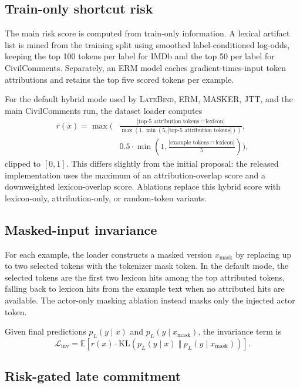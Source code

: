\documentclass{article}
\newcommand{\LateBind}{\textsc{LateBind}}
\newcommand{\risk}{r(x)}
\begin{document}
\subsection{Train-only shortcut risk}

The main risk score is computed from train-only information. A lexical artifact list is mined from the training split using smoothed label-conditioned log-odds, keeping the top 100 tokens per label for IMDb and the top 50 per label for CivilComments. Separately, an ERM model caches gradient-times-input token attributions and retains the top five scored tokens per example.

For the default hybrid mode used by \LateBind, ERM, MASKER, JTT, and the main CivilComments run, the dataset loader computes
\begin{align}
\risk = \max\!\Bigg(&\frac{|\text{top-5 attribution tokens} \cap \text{lexicon}|}{\max(1,\min(5, |\text{top-5 attribution tokens}|))}, \nonumber\\
&0.5 \cdot \min\!\left(1,\frac{|\text{example tokens} \cap \text{lexicon}|}{5}\right)\Bigg),
\end{align}
clipped to $[0,1]$. This differs slightly from the initial proposal: the released implementation uses the maximum of an attribution-overlap score and a downweighted lexicon-overlap score. Ablations replace this hybrid score with lexicon-only, attribution-only, or random-token variants.

\subsection{Masked-input invariance}

For each example, the loader constructs a masked version $x_{\mathrm{mask}}$ by replacing up to two selected tokens with the tokenizer mask token. In the default mode, the selected tokens are the first two lexicon hits among the top attributed tokens, falling back to lexicon hits from the example text when no attributed hits are available. The actor-only masking ablation instead masks only the injected actor token.

Given final predictions $p_L(y \mid x)$ and $p_L(y \mid x_{\mathrm{mask}})$, the invariance term is
\begin{equation}
\mathcal{L}_{\mathrm{inv}} = \mathbb{E}\left[\risk \cdot \mathrm{KL}\!\left(p_L(y \mid x)\; \Vert\; p_L(y \mid x_{\mathrm{mask}})\right)\right].
\end{equation}

\subsection{Risk-gated late commitment}
\end{document}
